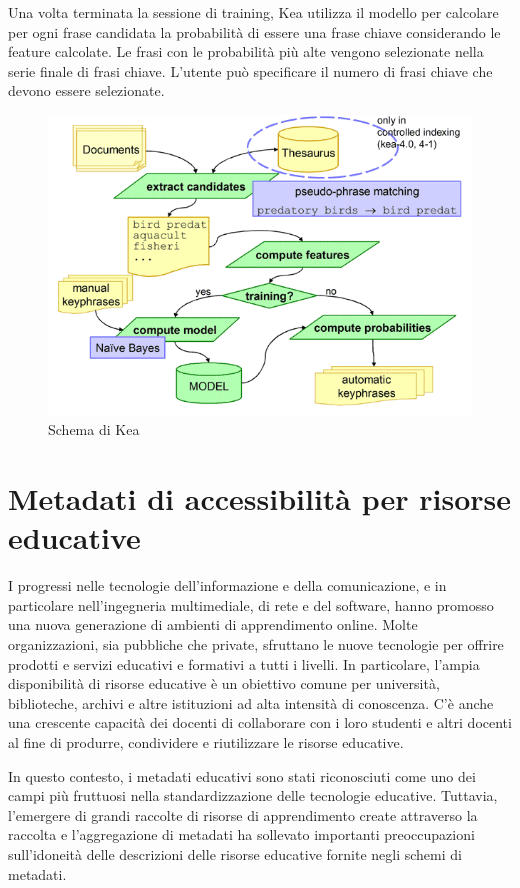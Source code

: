 Una volta terminata la sessione di training, Kea utilizza il modello per calcolare per ogni frase candidata la probabilità di essere una frase chiave considerando le feature calcolate. Le frasi con le probabilità più alte vengono selezionate nella serie finale di frasi chiave. L'utente può specificare il numero di frasi chiave che devono essere selezionate\cite{kea}.

\begin{figure}[H]
\centering
\includegraphics[scale=1]{res/kea_diagram.png}
\caption{Schema di Kea}
\label{fig:kea}
\end{figure}

\section{Metadati di accessibilità per risorse educative}
I progressi nelle tecnologie dell'informazione e della comunicazione, e in particolare nell'ingegneria multimediale, di rete e del software, hanno promosso una nuova generazione di ambienti di apprendimento online.
Molte organizzazioni, sia pubbliche che private, sfruttano le nuove tecnologie per offrire prodotti e servizi educativi e formativi a tutti i livelli. In particolare, l'ampia disponibilità di risorse educative è un obiettivo comune per università, biblioteche, archivi e altre istituzioni ad alta intensità di conoscenza. C'è anche una crescente capacità dei docenti di collaborare con i loro studenti e altri docenti al fine di produrre, condividere e riutilizzare le risorse educative.

In questo contesto, i metadati educativi sono stati riconosciuti come uno dei campi più fruttuosi nella standardizzazione delle tecnologie educative. Tuttavia, l'emergere di grandi raccolte di risorse di apprendimento create attraverso la raccolta e l'aggregazione di metadati ha sollevato importanti preoccupazioni sull'idoneità delle descrizioni delle risorse educative fornite negli schemi di metadati.


